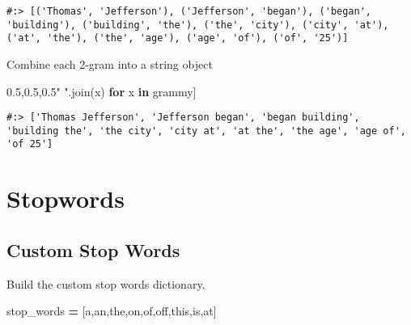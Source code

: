 \documentclass[
]{book}
\newenvironment{Shaded}{\begin{snugshade}}{\end{snugshade}}
\newcommand{\ControlFlowTok}[1]{\textcolor[rgb]{0.27,0.27,0.27}{\textbf{#1}}}
\newcommand{\KeywordTok}[1]{\textcolor[rgb]{0.27,0.27,0.27}{\textbf{#1}}}
\newcommand{\NormalTok}[1]{#1}
\newcommand{\OperatorTok}[1]{\textcolor[rgb]{0.43,0.43,0.43}{\textbf{#1}}}
\newcommand{\StringTok}[1]{\textcolor[rgb]{0.5,0.5,0.5}{#1}}
\begin{document}
\begin{verbatim}
#:> [('Thomas', 'Jefferson'), ('Jefferson', 'began'), ('began', 'building'), ('building', 'the'), ('the', 'city'), ('city', 'at'), ('at', 'the'), ('the', 'age'), ('age', 'of'), ('of', '25')]
\end{verbatim}

Combine each 2-gram into a string object

\begin{Shaded}
\begin{Highlighting}[]
\NormalTok{[ }\StringTok{" "}\NormalTok{.join(x) }\ControlFlowTok{for}\NormalTok{ x }\KeywordTok{in}\NormalTok{ grammy]}
\end{Highlighting}
\end{Shaded}

\begin{verbatim}
#:> ['Thomas Jefferson', 'Jefferson began', 'began building', 'building the', 'the city', 'city at', 'at the', 'the age', 'age of', 'of 25']
\end{verbatim}

\hypertarget{stopwords}{%
\section{Stopwords}\label{stopwords}}

\hypertarget{custom-stop-words}{%
\subsection{Custom Stop Words}\label{custom-stop-words}}

Build the custom stop words dictionary.

\begin{Shaded}
\begin{Highlighting}[]
\NormalTok{stop\_words }\OperatorTok{=}\NormalTok{ [}\StringTok{\textquotesingle{}a\textquotesingle{}}\NormalTok{,}\StringTok{\textquotesingle{}an\textquotesingle{}}\NormalTok{,}\StringTok{\textquotesingle{}the\textquotesingle{}}\NormalTok{,}\StringTok{\textquotesingle{}on\textquotesingle{}}\NormalTok{,}\StringTok{\textquotesingle{}of\textquotesingle{}}\NormalTok{,}\StringTok{\textquotesingle{}off\textquotesingle{}}\NormalTok{,}\StringTok{\textquotesingle{}this\textquotesingle{}}\NormalTok{,}\StringTok{\textquotesingle{}is\textquotesingle{}}\NormalTok{,}\StringTok{\textquotesingle{}at\textquotesingle{}}\NormalTok{]}
\end{Highlighting}
\end{Shaded}
\end{document}
